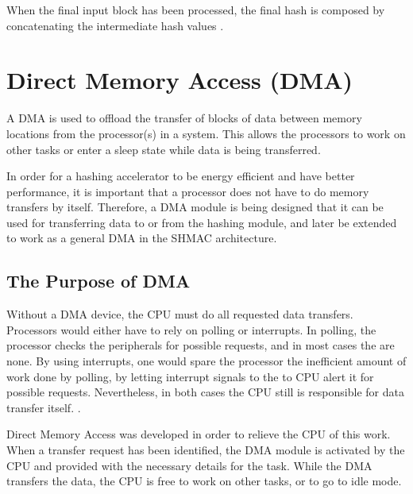 When the final input block has been processed, the final hash is composed by
concatenating the intermediate hash values \cite{sha-spec}.

\section{Direct Memory Access (DMA)}

A DMA is used to offload the transfer of blocks of data between memory locations from
the processor(s) in a system. This allows the processors to work on other tasks or enter
a sleep state while data is being transferred.

In order for a hashing accelerator to be energy efficient and have better performance,
it is important that a processor does not have to do memory transfers by itself. Therefore,
a DMA module is being designed that it can be used for transferring data to or from the hashing
module, and later be extended to work as a general DMA in the SHMAC architecture.

\subsection{The Purpose of DMA}

Without a DMA device, the CPU must do all requested data transfers.
Processors would either have to rely on polling or interrupts.
In polling, the processor checks the peripherals for possible requests, and in most cases the are none.
By using interrupts, one would spare the processor the inefficient amount of work done by polling, by letting interrupt signals to the to CPU alert it for possible requests.
Nevertheless, in both cases the CPU still is responsible for data transfer itself. \cite{computer-construction}.



Direct Memory Access was developed in order to relieve the CPU of this work.
When a transfer request has been identified, the DMA module is activated by the CPU and provided with the necessary details for the task.
While the DMA transfers the data, the CPU is free to work on other tasks, or to go to idle mode.
\cite{computer-construction}

